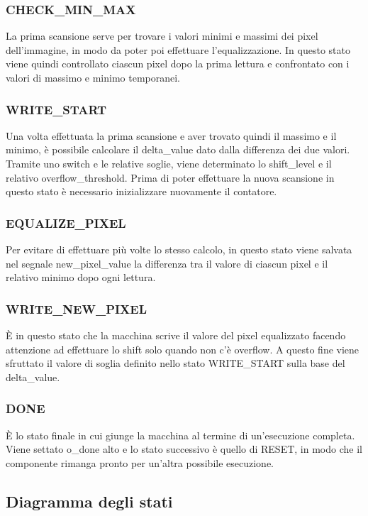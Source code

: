 \documentclass{article}
\begin{document}
\subsubsection{CHECK\_MIN\_MAX}
La prima scansione serve per trovare i valori minimi e massimi dei pixel dell'immagine, in modo da poter poi effettuare l'equalizzazione. In questo stato viene quindi controllato ciascun pixel dopo la prima lettura e confrontato con i valori di massimo e minimo temporanei.

\subsubsection{WRITE\_START}
Una volta effettuata la prima scansione e aver trovato quindi il massimo e il minimo, è possibile calcolare il delta\_value dato dalla differenza dei due valori. Tramite uno switch e le relative soglie, viene determinato lo shift\_level e il relativo overflow\_threshold. Prima di poter effettuare la nuova scansione in questo stato è necessario inizializzare nuovamente il contatore.

\subsubsection{EQUALIZE\_PIXEL}
Per evitare di effettuare più volte lo stesso calcolo, in questo stato viene salvata nel segnale new\_pixel\_value la differenza tra il valore di ciascun pixel e il relativo minimo dopo ogni lettura.

\subsubsection{WRITE\_NEW\_PIXEL}
È in questo stato che la macchina scrive il valore del pixel equalizzato facendo attenzione ad effettuare lo shift solo quando non c'è overflow. A questo fine viene sfruttato il valore di soglia definito nello stato WRITE\_START sulla base del delta\_value.

\subsubsection{DONE}
È lo stato finale in cui giunge la macchina al termine di un'esecuzione completa. Viene settato o\_done alto e lo stato successivo è quello di RESET, in modo che il componente rimanga pronto per un'altra possibile esecuzione.

\subsection{Diagramma degli stati}
\end{document}
